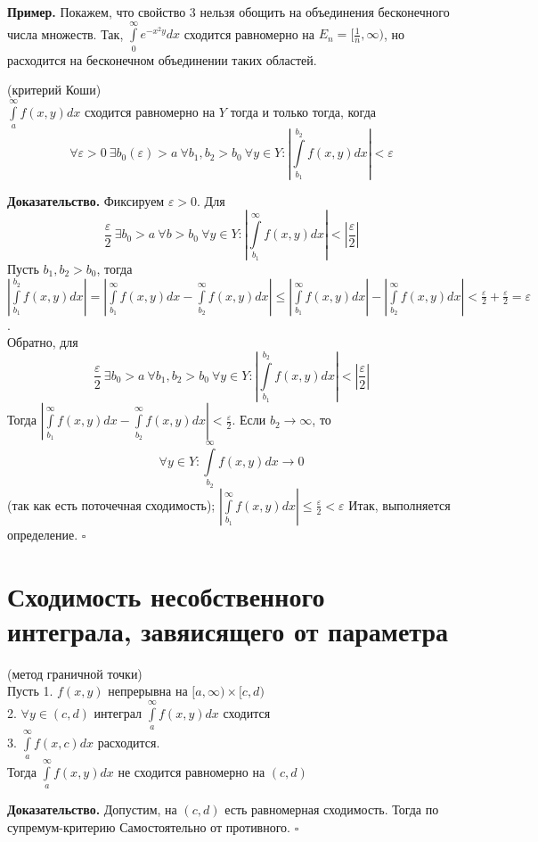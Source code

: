 \textbf{Пример.} Покажем, что свойство 3 нельзя обощить на объединения
бесконечного числа множеств. Так, $\int\limits_{0}^{\infty}e^{-x^2y}dx$
сходится равномерно на $E_n=[\frac{1}{n},\infty)$, но расходится на 
бесконечном объединении таких областей. 
\begin{theor}(критерий Коши)\\
    $\int\limits_{a}^{\infty}f(x,y)dx$ сходится равномерно на $Y$ тогда и 
    только тогда, когда 
     $$\forall \varepsilon>0~\exists b_0(\varepsilon)>a~\forall b_1,b_2>b_0~
 \forall y\in Y:\left|\int\limits_{b_1}^{b_2}f(x,y)dx\right|<\varepsilon$$
\end{theor}
\textbf{Доказательство.}  Фиксируем $\varepsilon>0$. Для 
$$\frac{\varepsilon}{2}~\exists b_0>a~\forall b>b_0~\forall y\in Y:
\left|\int\limits_{b_1}^{\infty}f(x,y)dx\right|<
\left|\frac{\varepsilon}{2}\right|$$
Пусть $b_1,b_2>b_0$, тогда $\left| \int\limits_{b_1}^{b_2}f(x,y)dx\right|=
\left|\int\limits_{b_1}^{\infty}f(x,y)dx-\int\limits_{b_2}^{\infty} f(x,y)dx
\right|\leqslant 
\left|\int\limits_{b_1}^{\infty}f(x,y)dx\right|
-\left|\int\limits_{b_2}^{\infty} f(x,y)dx\right|<
\frac{\varepsilon}{2}+\frac{\varepsilon}{2}=\varepsilon$.\\
Обратно, для
$$\frac{\varepsilon}{2}~\exists b_0>a~\forall b_1,b_2>b_0~\forall y\in Y:
\left|\int\limits_{b_1}^{b_2}f(x,y)dx\right|<
\left|\frac{\varepsilon}{2}\right|$$
Тогда 
$\left|\int\limits_{b_1}^{\infty}f(x,y)dx-\int\limits_{b_2}^{\infty} f(x,y)dx
\right|<\frac{\varepsilon}{2}$. Если $b_2\to \infty$, то
$$\forall y\in Y: \int\limits_{b_2}^{\infty}f(x,y)dx\to 0$$ 
(так как есть поточечная сходимость);
$\left|\int\limits_{b_1}^{\infty}f(x,y)dx\right|\leqslant\frac{\varepsilon}{2}
<\varepsilon$
Итак, выполняется определение. $\square$ \\
\section{Сходимость несобственного интеграла, завяисящего от параметра}
\begin{theor}
    (метод граничной точки)\\
    Пусть 1. $f(x,y)$ непрерывна на $[a,\infty)\times[c,d)$\\
    2. $\forall y\in (c,d)$ интеграл $\int\limits_{a}^{\infty} f(x,y)dx$ 
    сходится \\
    3. $\int\limits_{a}^{\infty}f(x,c)dx$ расходится.\\
    Тогда $\int\limits_{a}^{\infty}f(x,y)dx$ не сходится равномерно на 
    $(c,d)$
\end{theor}
\textbf{Доказательство.} Допустим, на $(c,d)$ есть равномерная сходимость.
Тогда по супремум-критерию
Самостоятельно от противного. 
$\square$ 

